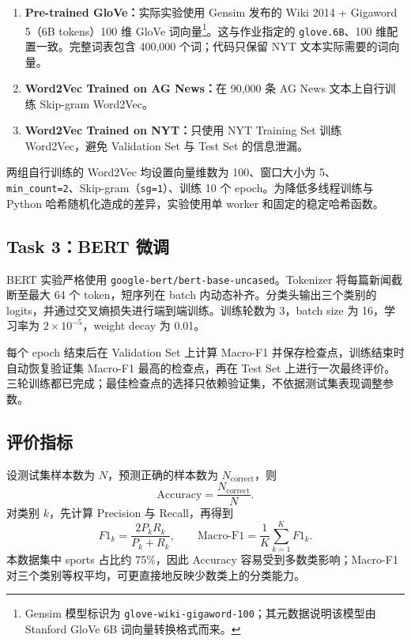 \documentclass[UTF8,a4paper,10pt]{ctexart}
\newcommand{\method}[1]{\texttt{#1}}
\begin{document}
\begin{enumerate}[leftmargin=2.3em]
  \item \textbf{Pre-trained GloVe：}实际实验使用 Gensim 发布的 Wiki 2014 + Gigaword 5（6B tokens）100 维 GloVe 词向量\cite{pennington2014}\footnote{Gensim 模型标识为 \texttt{glove-wiki-gigaword-100}；其元数据说明该模型由 Stanford GloVe 6B 词向量转换格式而来。}。这与作业指定的 \method{glove.6B}、100 维配置一致。完整词表包含 400,000 个词；代码只保留 NYT 文本实际需要的词向量。
  \item \textbf{Word2Vec Trained on AG News：}在 90,000 条 AG News 文本上自行训练 Skip-gram Word2Vec\cite{mikolov2013}。
  \item \textbf{Word2Vec Trained on NYT：}只使用 NYT Training Set 训练 Word2Vec，避免 Validation Set 与 Test Set 的信息泄漏。
\end{enumerate}

两组自行训练的 Word2Vec 均设置向量维数为 100、窗口大小为 5、\method{min\_count=2}、Skip-gram（\method{sg=1}）、训练 10 个 epoch。为降低多线程训练与 Python 哈希随机化造成的差异，实验使用单 worker 和固定的稳定哈希函数。

\subsection{Task 3：BERT 微调}

BERT 实验严格使用 \method{google-bert/bert-base-uncased}\cite{devlin2019}。Tokenizer 将每篇新闻截断至最大 64 个 token，短序列在 batch 内动态补齐。分类头输出三个类别的 logits，并通过交叉熵损失进行端到端训练。训练轮数为 3，batch size 为 16，学习率为 $2\times10^{-5}$，weight decay 为 0.01。

每个 epoch 结束后在 Validation Set 上计算 Macro-F1 并保存检查点，训练结束时自动恢复验证集 Macro-F1 最高的检查点，再在 Test Set 上进行一次最终评价。三轮训练都已完成；最佳检查点的选择只依赖验证集，不依据测试集表现调整参数。

\subsection{评价指标}

设测试集样本数为 $N$，预测正确的样本数为 $N_{\mathrm{correct}}$，则
\begin{equation}
  \mathrm{Accuracy}=\frac{N_{\mathrm{correct}}}{N}.
\end{equation}
对类别 $k$，先计算 Precision 与 Recall，再得到
\begin{equation}
  F1_k=\frac{2P_kR_k}{P_k+R_k},\qquad
  \mathrm{Macro\mbox{-}F1}=\frac{1}{K}\sum_{k=1}^{K}F1_k.
\end{equation}
本数据集中 sports 占比约 75\%，因此 Accuracy 容易受到多数类影响；Macro-F1 对三个类别等权平均，可更直接地反映少数类上的分类能力。
\end{document}
